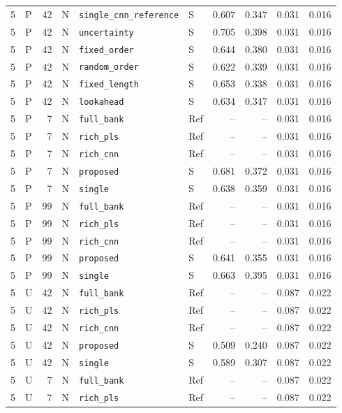 \documentclass[10pt,a4paper]{article}
\begin{document}
\begin{landscape}
\begin{longtable}{rlrlllrrrr}
5 & P & 42 & N & \texttt{single\_cnn\_reference} & S & 0.607 & 0.347 & 0.031 & 0.016 \\
5 & P & 42 & N & \texttt{uncertainty} & S & 0.705 & 0.398 & 0.031 & 0.016 \\
5 & P & 42 & N & \texttt{fixed\_order} & S & 0.644 & 0.380 & 0.031 & 0.016 \\
5 & P & 42 & N & \texttt{random\_order} & S & 0.622 & 0.339 & 0.031 & 0.016 \\
5 & P & 42 & N & \texttt{fixed\_length} & S & 0.653 & 0.338 & 0.031 & 0.016 \\
5 & P & 42 & N & \texttt{lookahead} & S & 0.634 & 0.347 & 0.031 & 0.016 \\
5 & P & 7 & N & \texttt{full\_bank} & Ref & -- & -- & 0.031 & 0.016 \\
5 & P & 7 & N & \texttt{rich\_pls} & Ref & -- & -- & 0.031 & 0.016 \\
5 & P & 7 & N & \texttt{rich\_cnn} & Ref & -- & -- & 0.031 & 0.016 \\
5 & P & 7 & N & \texttt{proposed} & S & 0.681 & 0.372 & 0.031 & 0.016 \\
5 & P & 7 & N & \texttt{single} & S & 0.638 & 0.359 & 0.031 & 0.016 \\
5 & P & 99 & N & \texttt{full\_bank} & Ref & -- & -- & 0.031 & 0.016 \\
5 & P & 99 & N & \texttt{rich\_pls} & Ref & -- & -- & 0.031 & 0.016 \\
5 & P & 99 & N & \texttt{rich\_cnn} & Ref & -- & -- & 0.031 & 0.016 \\
5 & P & 99 & N & \texttt{proposed} & S & 0.641 & 0.355 & 0.031 & 0.016 \\
5 & P & 99 & N & \texttt{single} & S & 0.663 & 0.395 & 0.031 & 0.016 \\
5 & U & 42 & N & \texttt{full\_bank} & Ref & -- & -- & 0.087 & 0.022 \\
5 & U & 42 & N & \texttt{rich\_pls} & Ref & -- & -- & 0.087 & 0.022 \\
5 & U & 42 & N & \texttt{rich\_cnn} & Ref & -- & -- & 0.087 & 0.022 \\
5 & U & 42 & N & \texttt{proposed} & S & 0.509 & 0.240 & 0.087 & 0.022 \\
5 & U & 42 & N & \texttt{single} & S & 0.589 & 0.307 & 0.087 & 0.022 \\
5 & U & 7 & N & \texttt{full\_bank} & Ref & -- & -- & 0.087 & 0.022 \\
5 & U & 7 & N & \texttt{rich\_pls} & Ref & -- & -- & 0.087 & 0.022 \\

\end{longtable}
\end{landscape}
\end{document}
